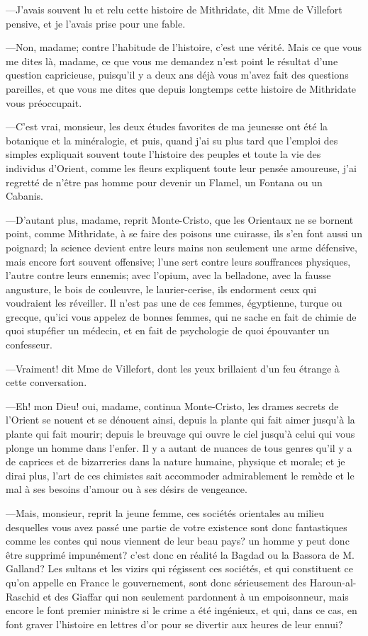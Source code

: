 —J'avais souvent lu et relu cette histoire de Mithridate, dit Mme de Villefort pensive, et je l'avais prise pour une fable.  

—Non, madame; contre l'habitude de l'histoire, c'est une vérité. Mais ce que vous me dites là, madame, ce que vous me demandez n'est point le résultat d'une question capricieuse, puisqu'il y a deux ans déjà vous m'avez fait des questions pareilles, et que vous me dites que depuis longtemps cette histoire de Mithridate vous préoccupait. 

—C'est vrai, monsieur, les deux études favorites de ma jeunesse ont été la botanique et la minéralogie, et puis, quand j'ai su plus tard que l'emploi des simples expliquait souvent toute l'histoire des peuples et toute la vie des individus d'Orient, comme les fleurs expliquent toute leur pensée amoureuse, j'ai regretté de n'être pas homme pour devenir un Flamel, un Fontana ou un Cabanis.  

—D'autant plus, madame, reprit Monte-Cristo, que les Orientaux ne se bornent point, comme Mithridate, à se faire des poisons une cuirasse, ils s'en font aussi un poignard; la science devient entre leurs mains non seulement une arme défensive, mais encore fort souvent offensive; l'une sert contre leurs souffrances physiques, l'autre contre leurs ennemis; avec l'opium, avec la belladone, avec la fausse angusture, le bois de couleuvre, le laurier-cerise, ils endorment ceux qui voudraient les réveiller. Il n'est pas une de ces femmes, égyptienne, turque ou grecque, qu'ici vous appelez de bonnes femmes, qui ne sache en fait de chimie de quoi stupéfier un médecin, et en fait de psychologie de quoi épouvanter un confesseur. 

—Vraiment! dit Mme de Villefort, dont les yeux brillaient d'un feu étrange à cette conversation. 

—Eh! mon Dieu! oui, madame, continua Monte-Cristo, les drames secrets de l'Orient se nouent et se dénouent ainsi, depuis la plante qui fait aimer jusqu'à la plante qui fait mourir; depuis le breuvage qui ouvre le ciel jusqu'à celui qui vous plonge un homme dans l'enfer. Il y a autant de nuances de tous genres qu'il y a de caprices et de bizarreries dans la nature humaine, physique et morale; et je dirai plus, l'art de ces chimistes sait accommoder admirablement le remède et le mal à ses besoins d'amour ou à ses désirs de vengeance. 

—Mais, monsieur, reprit la jeune femme, ces sociétés orientales au milieu desquelles vous avez passé une partie de votre existence sont donc fantastiques comme les contes qui nous viennent de leur beau pays? un homme y peut donc être supprimé impunément? c'est donc en réalité la Bagdad ou la Bassora de M. Galland? Les sultans et les vizirs qui régissent ces sociétés, et qui constituent ce qu'on appelle en France le gouvernement, sont donc sérieusement des Haroun-al-Raschid et des Giaffar qui non seulement pardonnent à un empoisonneur, mais encore le font premier ministre si le crime a été ingénieux, et qui, dans ce cas, en font graver l'histoire en lettres d'or pour se divertir aux heures de leur ennui? 

